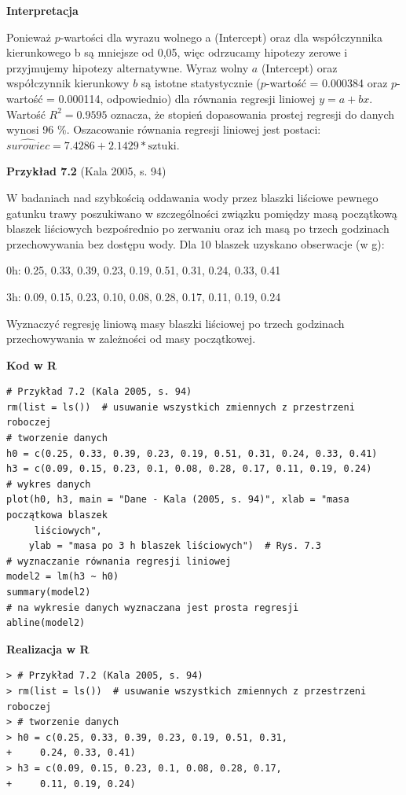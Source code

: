 \documentclass[12pt,B5paper,]{book}
\begin{document}
\vspace{0.8cm} \textbf{Interpretacja}

Ponieważ \(p\)-wartości dla wyrazu wolnego a (Intercept) oraz dla
współczynnika kierunkowego b są mniejsze od 0,05, więc odrzucamy
hipotezy zerowe i przyjmujemy hipotezy alternatywne. Wyraz wolny \(a\)
(Intercept) oraz współczynnik kierunkowy \(b\) są istotne statystycznie
(\(p\)-wartość = 0.000384 oraz \(p\)-wartość = 0.000114, odpowiednio)
dla równania regresji liniowej \(y =a+bx\). Wartość \(R^2=0.9595\)
oznacza, że stopień dopasowania prostej regresji do danych wynosi 96 \%.
Oszacowanie równania regresji liniowej jest postaci:
\(\widehat{surowiec} = 7.4286 + 2.1429 * \textrm{sztuki}\).

\vspace{0.8cm} \textbf{Przykład 7.2} (Kala 2005, s. 94)

W badaniach nad szybkością oddawania wody przez blaszki liściowe pewnego
gatunku trawy poszukiwano w szczególności związku pomiędzy masą
początkową blaszek liściowych bezpośrednio po zerwaniu oraz ich masą po
trzech godzinach przechowywania bez dostępu wody. Dla 10 blaszek
uzyskano obserwacje (w g):

0h: 0.25, 0.33, 0.39, 0.23, 0.19, 0.51, 0.31, 0.24, 0.33, 0.41

3h: 0.09, 0.15, 0.23, 0.10, 0.08, 0.28, 0.17, 0.11, 0.19, 0.24

Wyznaczyć regresję liniową masy blaszki liściowej po trzech godzinach
przechowywania w zależności od masy początkowej.

\vspace{0.8cm} \textbf{Kod w R}

\begin{verbatim}
# Przykład 7.2 (Kala 2005, s. 94)
rm(list = ls())  # usuwanie wszystkich zmiennych z przestrzeni roboczej
# tworzenie danych
h0 = c(0.25, 0.33, 0.39, 0.23, 0.19, 0.51, 0.31, 0.24, 0.33, 0.41)
h3 = c(0.09, 0.15, 0.23, 0.1, 0.08, 0.28, 0.17, 0.11, 0.19, 0.24)
# wykres danych
plot(h0, h3, main = "Dane - Kala (2005, s. 94)", xlab = "masa początkowa blaszek 
     liściowych", 
    ylab = "masa po 3 h blaszek liściowych")  # Rys. 7.3
# wyznaczanie równania regresji liniowej
model2 = lm(h3 ~ h0)
summary(model2)
# na wykresie danych wyznaczana jest prosta regresji
abline(model2)
\end{verbatim}

\vspace{0.8cm} \textbf{Realizacja w R}

\begin{verbatim}
> # Przykład 7.2 (Kala 2005, s. 94)
> rm(list = ls())  # usuwanie wszystkich zmiennych z przestrzeni roboczej
> # tworzenie danych
> h0 = c(0.25, 0.33, 0.39, 0.23, 0.19, 0.51, 0.31, 
+     0.24, 0.33, 0.41)
> h3 = c(0.09, 0.15, 0.23, 0.1, 0.08, 0.28, 0.17, 
+     0.11, 0.19, 0.24)
\end{verbatim}
\end{document}
